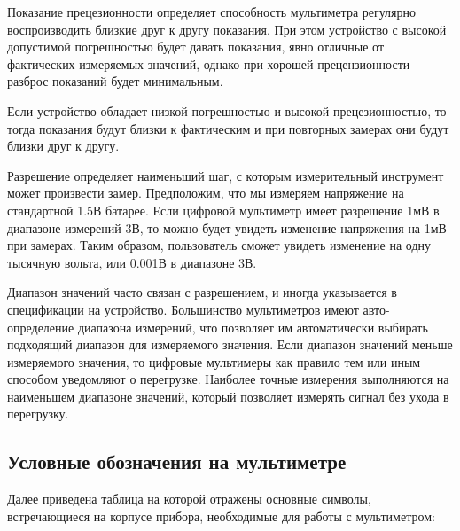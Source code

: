 \documentclass[../main.tex]{subfiles}
\begin{document}
Показание прецезионности определяет способность мультиметра регулярно
воспроизводить близкие друг к другу показания.  При этом устройство с высокой
допустимой погрешностью будет давать показания, явно отличные от фактических
измеряемых значений, однако при хорошей прецензионности разброс показаний будет
минимальным.

Если устройство обладает низкой погрешностью и высокой прецезионностью, то тогда
показания будут близки к фактическим и при повторных замерах они будут близки
друг к другу.

Разрешение определяет наименьший шаг, с которым измерительный инструмент может
произвести замер.  Предположим, что мы измеряем напряжение на стандартной 1.5В
батарее.  Если цифровой мультиметр имеет разрешение 1мВ в диапазоне измерений
3В, то можно будет увидеть изменение напряжения на 1мВ при замерах.  Таким
образом, пользователь сможет увидеть изменение на одну тысячную вольта, или
0.001В в диапазоне 3В.

Диапазон значений часто связан с разрешением, и иногда указывается в
спецификации на устройство.  Большинство мультиметров имеют авто-определение
диапазона измерений, что позволяет им автоматически выбирать подходящий диапазон
для измеряемого значения.  Если диапазон значений меньше измеряемого значения,
то цифровые мультимеры как правило тем или иным способом уведомляют о
перегрузке.  Наиболее точные измерения выполняются на наименьшем диапазоне
значений, который позволяет измерять сигнал без ухода в перегрузку.

\subsection{Условные обозначения на мультиметре}

Далее приведена таблица на которой отражены основные символы, встречающиеся на
корпусе прибора, необходимые для работы с мультиметром:
\end{document}
